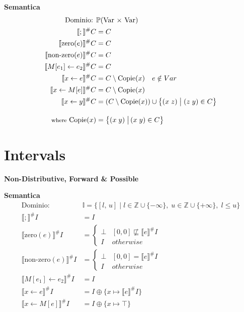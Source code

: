 \documentclass[a4paper,12pt,openany]{article}
\begin{document}
    \textbf{Semantica}
    \begin{align*}
        \mbox{Dominio: }& \mathbb{P}(\mbox{Var $\times$ Var})\\
        \llbracket ; \rrbracket^\#C &= C\\
        \llbracket \mbox{zero}(e) \rrbracket^\#C &= C\\
        \llbracket \mbox{non-zero}(e) \rrbracket^\#C &= C\\
        \llbracket M[e_1]\leftarrow e_2 \rrbracket^\#C &= C\\
        \llbracket x \leftarrow e \rrbracket^\#C &= C\setminus \mbox{Copie}(x)\quad e\notin Var\\
        \llbracket x \leftarrow M[e] \rrbracket^\#C &= C\setminus \mbox{Copie}(x)\\
        \llbracket x\leftarrow y \rrbracket^\#C &= (C\setminus \mbox{Copie}(x)) \cup
        \left\{
            (x\; z) \;\big\vert\; (z\; y) \in C
        \right\}\\[1em]
        \mbox{{\footnotesize where} Copie}(x) &=
        \left\{
        (x\; y) \;\big\vert\, (x\; y) \in C
        \right\}\\
    \end{align*}
    
    
    \section*{Intervals}
    \textbf{Non-Distributive, Forward \& Possible}

    \textbf{Semantica}
    \begin{align*}
    \mbox{Dominio: }& \mathbb{I}=\{[l,\,u]\;\big\vert\; l\in\mathbb{Z}\cup\{-\infty\},\; u\in\mathbb{Z}\cup\{+\infty\},\; l\leq u\}\\
    \llbracket ; \rrbracket^\#I &= I\\
    \llbracket \mbox{zero}(e) \rrbracket^\#I &= 
    \begin{cases}
        \bot & [0, 0] \not\sqsubseteq \llbracket e \rrbracket^\#I\\
        I & otherwise
    \end{cases}\\
    \llbracket \mbox{non-zero}(e) \rrbracket^\#I &= 
    \begin{cases}
        \bot & [0, 0] = \llbracket e \rrbracket^\#I\\
        I & otherwise
    \end{cases}\\
    \llbracket M[e_1]\leftarrow e_2 \rrbracket^\#I &= I\\
    \llbracket x \leftarrow e \rrbracket^\#I &= I\oplus \{x\mapsto\llbracket e \rrbracket^\#I\}\\
    \llbracket x \leftarrow M[e] \rrbracket^\#I &= I\oplus \{x\mapsto\top\}
    \end{align*}
\end{document}
